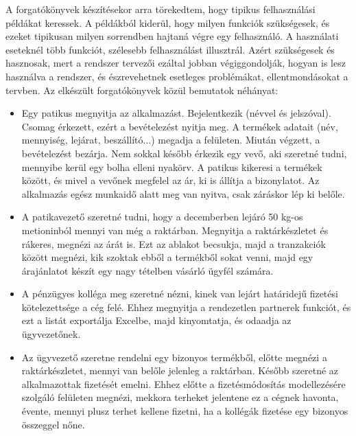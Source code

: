 \documentclass[12pt]{article}
\begin{document}
A forgatókönyvek készítésekor arra törekedtem, hogy tipikus felhasználási példákat keressek. A példákból kiderül, hogy milyen funkciók szükségesek, és ezeket tipikusan milyen sorrendben hajtaná végre egy felhasználó. A használati eseteknél több funkciót, szélesebb felhasználást illusztrál. Azért szükségesek és hasznosak, mert a rendszer tervezői ezáltal jobban végiggondolják, hogyan is lesz használva a rendszer, és észrevehetnek esetleges problémákat, ellentmondásokat a tervben. Az elkészült forgatókönyvek közül bemutatok néhányat: 
\begin{itemize}
\item Egy patikus megnyitja az alkalmazást. Bejelentkezik (névvel és jelszóval). Csomag érkezett, ezért a bevételezést nyitja meg. A termékek adatait (név, mennyiség, lejárat, beszállító...) megadja a felületen. Miután végzett, a bevételezést bezárja. Nem sokkal később érkezik egy vevő, aki szeretné tudni, mennyibe kerül egy bolha elleni nyakörv. A patikus kikeresi a termékek között, és mivel a vevőnek megfelel az ár, ki is állítja a bizonylatot. Az alkalmazás egész munkaidő alatt meg van nyitva, csak záráskor lép ki belőle.
\item A patikavezető szeretné tudni, hogy a decemberben lejáró 50 kg-os metioninból mennyi van még a raktárban. Megnyitja a raktárkészletet és rákeres, megnézi az árát is. Ezt az ablakot becsukja, majd a tranzakciók között megnézi, kik szoktak ebből a termékből sokat venni, majd egy árajánlatot készít egy nagy tételben vásárló ügyfél számára.
\item A pénzügyes kolléga meg szeretné nézni, kinek van lejárt határidejű fizetési kötelezettsége a cég felé. Ehhez megnyitja a rendezetlen partnerek funkciót, és ezt a listát exportálja Excelbe, majd kinyomtatja, és odaadja az ügyvezetőnek. 
\item Az ügyvezető szeretne rendelni egy bizonyos termékből, előtte megnézi a raktárkészletet, mennyi van belőle jelenleg a raktárban. Később szeretné az alkalmazottak fizetését emelni. Ehhez előtte a fizetésmódosítás modellezésére szolgáló felületen megnézi, mekkora terheket jelentene ez a cégnek havonta, évente, mennyi plusz terhet kellene fizetni, ha a kollégák fizetése egy bizonyos összeggel nőne.
\end{itemize}
\end{document}
